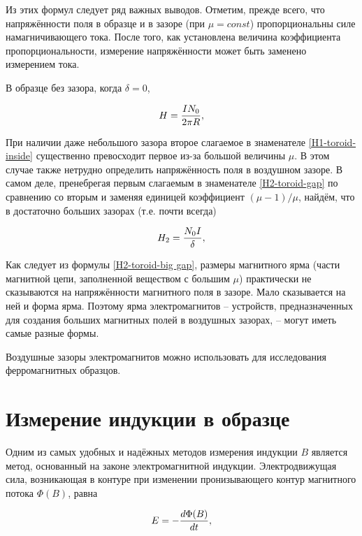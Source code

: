 Из этих формул следует ряд важных выводов. Отметим, прежде всего, что напряжённости поля в образце и в зазоре (при $\mu = const$) пропорциональны силе намагничивающего тока. После того, как установлена величина коэффициента пропорциональности, измерение напряжённости может быть заменено измерением тока.

В образце без зазора, когда $\delta = 0$,


\begin{equation}
	\eqmark[H-toroid-without gap]
	H = \frac{IN_0}{2\pi R},
\end{equation}

При наличии даже небольшого зазора второе слагаемое в знаменателе \eqref{H1-toroid-inside} существенно превосходит первое из-за большой величины $\mu$. В этом случае также нетрудно определить напряжённость поля в воздушном зазоре. В самом деле, пренебрегая первым слагаемым в знаменателе \eqref{H2-toroid-gap} по сравнению со вторым и заменяя единицей коэффициент $(\mu - 1)/\mu$, найдём, что в достаточно больших зазорах (т.е. почти всегда)

\begin{equation}
	\eqmark[H2-toroid-big gap]
	H_2 = \frac{N_0 I}{\delta},
\end{equation}

Как следует из формулы \eqref{H2-toroid-big gap}, размеры магнитного ярма (части магнитной цепи, заполненной веществом с большим $\mu$) практически не сказываются на напряжённости магнитного поля в зазоре. Мало сказывается на ней и форма ярма. Поэтому ярма электромагнитов -- устройств, предназначенных для создания больших магнитных полей в воздушных зазорах, -- могут иметь самые разные формы.

Воздушные зазоры электромагнитов можно использовать для исследования ферромагнитных образцов.

\section{Измерение индукции в образце}

Одним из самых удобных и надёжных методов измерения индукции $B$ является метод, основанный на законе электромагнитной индукции. Электродвижущая сила, возникающая в контуре при изменении пронизывающего контур магнитного потока $\Phi (B)$, равна

\begin{equation}
	\eqmark[EMF-magnetic flux]
	E = - \frac{d\Phi (B)}{dt},
\end{equation}

